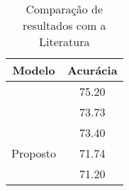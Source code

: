 \begin{table}[!htb]
\centering
\caption{Comparação de resultados com a Literatura}
\label{tbl:results}
\begin{tabular}{@{}cc@{}}
\toprule
Modelo                                                     & Acurácia \\ \midrule
\cite{DBLP:journals/corr/PramerdorferK16} & 75.20     \\
\cite{Kim2016FusingAA}                    & 73.73    \\
\cite{al2016facial}                       & 73.40     \\
Proposto                                            & 71.74    \\
\cite{DBLP:journals/corr/Tang13}          & 71.20     \\ \bottomrule
\end{tabular}
\end{table}
